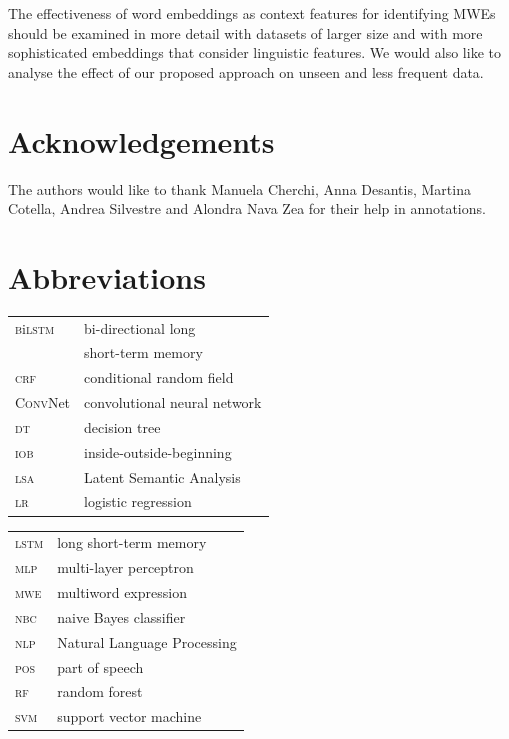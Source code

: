 \documentclass[output=paper,modfonts,nonflat]{langsci/langscibook}
\begin{document}
The effectiveness of word embeddings as context features for identifying MWEs should be examined in more detail with datasets of larger size and with more sophisticated embeddings that consider linguistic features. We would also like to analyse the effect of our proposed approach on unseen and less frequent data. 


\section*{Acknowledgements}
The authors would like to thank Manuela Cherchi, Anna Desantis, Martina Cotella, Andrea Silvestre and Alondra Nava Zea for their help in annotations.

\section*{Abbreviations}


\begin{tabularx}{.52\textwidth}{ll}
 \textsc{b}i\textsc{lstm}  & bi-directional long \\ 
 & short-term memory  \\
\textsc{crf}  & conditional random field  \\
\textsc{ConvN}et  & convolutional neural network \\
\textsc{dt}  & decision tree  \\
\textsc{iob}  & inside-outside-beginning  \\
\textsc{lsa}  & Latent Semantic Analysis  \\
\textsc{lr}  & logistic regression  \\
\end{tabularx}
\begin{tabularx}{.48\textwidth}{ll}
\textsc{lstm}  & long short-term memory \\
\textsc{mlp}   & multi-layer perceptron \\
\textsc{mwe} & multiword expression \\
\textsc{nbc}  & naive Bayes classifier  \\
\textsc{nlp} & Natural Language Processing  \\
\textsc{pos} & part of speech  \\
\textsc{rf}  & random forest \\
\textsc{svm}  & support vector machine \\
\end{tabularx}


{\sloppy
\printbibliography[heading=subbibliography,notkeyword=this]
}
\end{document}
